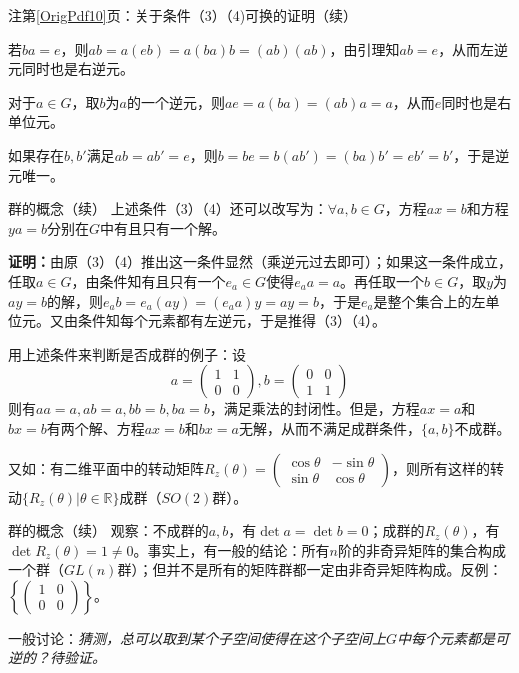 \documentclass{beamer}
\newcommand{\refpage}[1]{第\ref{OrigPdf#1}页}%
\begin{document}
\begin{frame}{注\refpage{10}：关于条件（3）（4)可换的证明（续）}
	
	若$ba=e$，则$ab=a(eb)=a(ba)b=(ab)(ab)$，由引理知$ab=e$，从而左逆元同时也是右逆元。
	
	对于$a\in G$，取$b$为$a$的一个逆元，则$ae=a(ba)=(ab)a=a$，从而$e$同时也是右单位元。
	
	如果存在$b,b'$满足$ab=ab'=e$，则$b=be=b(ab')=(ba)b'=eb'=b'$，于是逆元唯一。\qedsymbol
	
\end{frame}

\begin{frame}{群的概念（续）}
上述条件（3）（4）还可以改写为：$\forall a,b\in G$，方程$ax=b$和方程$ya=b$分别在$G$中有且只有一个解。

\textbf{证明：}由原（3）（4）推出这一条件显然（乘逆元过去即可）；如果这一条件成立，任取$a\in G$，由条件知有且只有一个$e_a\in G$使得$e_aa=a$。再任取一个$b\in G$，取$y$为$ay=b$的解，则$e_ab=e_a(ay)=(e_aa)y=ay=b$，于是$e_a$是整个集合上的左单位元。又由条件知每个元素都有左逆元，于是推得（3）（4）。\qedsymbol

用上述条件来判断是否成群的例子：设
\begin{equation*}
a=\begin{pmatrix}1 & 1 \\ 0 & 0\end{pmatrix}, b=\begin{pmatrix}0 & 0 \\ 1 & 1\end{pmatrix}
\end{equation*}
则有$aa=a,ab=a,bb=b,ba=b$，满足乘法的封闭性。但是，方程$ax=a$和$bx=b$有两个解、方程$ax=b$和$bx=a$无解，从而不满足成群条件，$\{a,b\}$不成群。

又如：有二维平面中的转动矩阵$R_z(\theta)=\begin{pmatrix}\cos\theta & -\sin\theta \\ \sin\theta & \cos\theta\end{pmatrix}$，则所有这样的转动$\{R_z(\theta)|\theta\in\mathbb{R}\}$成群（$SO(2)$群）。
\end{frame}

\begin{frame}{群的概念（续）}
观察：不成群的$a,b$，有$\det a=\det b=0$；成群的$R_z(\theta)$，有$\det R_z(\theta)=1\neq 0$。事实上，有一般的结论：所有$n$阶的非奇异矩阵的集合构成一个群（$GL(n)$群）；但并不是所有的矩阵群都一定由非奇异矩阵构成。反例：$\left\{\begin{pmatrix}1 & 0 \\ 0 & 0\end{pmatrix}\right\}$。

一般讨论：\textit{猜测，总可以取到某个子空间使得在这个子空间上$G$中每个元素都是可逆的？待验证。}
\end{frame}
\end{document}
